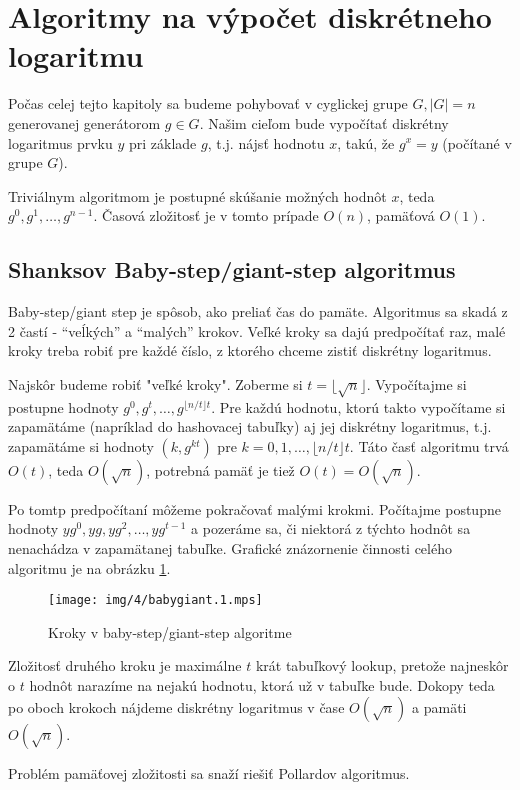 \section{Algoritmy na výpočet diskrétneho logaritmu}
Počas celej tejto kapitoly sa budeme pohybovať v cyglickej grupe 
$G, |G|=n$ generovanej generátorom $g \in G$.
Našim cieľom bude vypočítať diskrétny logaritmus prvku $y$
pri základe $g$, t.j. nájsť hodnotu $x$, takú, že $g^x=y$ (počítané
v grupe $G$).


Triviálnym algoritmom je postupné skúšanie možných hodnôt $x$, teda
$g^0,g^1,\dots,g^{n-1}$.
Časová zložitosť je v tomto prípade $O(n)$, pamäťová $O(1)$.

\subsection{Shanksov Baby-step/giant-step algoritmus}
Baby-step/giant step je spôsob, ako preliať čas do pamäte.
Algoritmus sa skadá z 2 častí - ``veĺkých'' a ``malých'' krokov.
Veľké kroky sa dajú predpočítať raz, malé kroky treba robiť pre každé
číslo, z ktorého chceme zistiť diskrétny logaritmus.

Najskôr budeme robiť "veľké kroky".
Zoberme si $t=\lfloor \sqrt{n} \rfloor$.
Vypočítajme si postupne hodnoty $g^0,g^t,\dots,g^{\lfloor n/t \rfloor t}$.
Pre každú hodnotu, ktorú takto vypočítame si zapamätáme (napríklad do
hashovacej tabuľky) aj jej diskrétny logaritmus, t.j. zapamätáme si hodnoty
$(k,g^{kt})$ pre $k=0,1,\dots,\lfloor n/t \rfloor t$.
Táto časť algoritmu trvá $O(t)$, teda $O(\sqrt{n})$, potrebná pamäť je
tiež $O(t)=O(\sqrt{n})$.

Po tomtp predpočítaní môžeme pokračovať malými krokmi.
Počítajme postupne hodnoty $y g^0,yg,yg^2,\dots, yg^{t-1}$ a pozeráme sa,
či niektorá z týchto hodnôt sa nenachádza v zapamätanej tabuľke.
Grafické znázornenie činnosti celého algoritmu je na obrázku
\ref{fig:babygiant}.
\begin{figure}[h]
    \centering
    \label{fig:babygiant}
    \caption{Kroky v baby-step/giant-step algoritme}
    \texttt{[image: img/4/babygiant.1.mps]}
\end{figure}

Zložitosť druhého kroku je maximálne $t$ krát tabuľkový lookup, pretože
najneskôr o $t$ hodnôt narazíme na nejakú hodnotu, ktorá už v tabuľke bude.
Dokopy teda po oboch krokoch nájdeme diskrétny logaritmus
v čase $O(\sqrt{n})$ a pamäti $O(\sqrt{n})$.

Problém pamäťovej zložitosti sa snaží riešiť Pollardov algoritmus.

